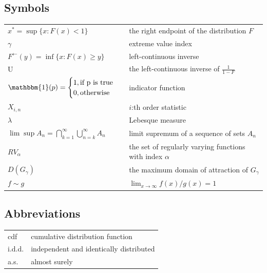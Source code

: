 \documentclass[english,12pt,a4paper,pdftex,sci,utf8]{aaltothesis} %
\begin{document}
\newpage


\thesistableofcontents



\subsection*{Symbols}

\begin{tabular}{ll}
$x^*=\sup\{x : F(x)<1\}$  & the right endpoint of the distribution $F$ \\
$\gamma$ & extreme value index \\
$F^{\leftarrow}(y) = \inf\{x:F(x) \geq y \}$ & left-continuous inverse \\
U & the left-continuous inverse of $\frac{1}{1-F}$ \\
$\mathbbm{1}(p)=
\begin{cases}
1 , \textrm{if p is true}\\
0, \textrm{otherwise}
\end{cases}$ & indicator function \\
$X_{i,n}$ & $i$:th order statistic \\
$\lambda$ & Lebesque measure \\
$\lim \sup A_n = \bigcap_{k=1}^{\infty} \bigcup_{n=k}^{\infty} A_n$ & limit supremum of a sequence of sets $A_n$ \\
$RV_{\alpha}$ & the set of regularly varying functions with index $\alpha$ \\
$D(G_{\gamma})$ & the maximum domain of attraction of $G_{\gamma}$ \\
$f \sim g$ & $\lim_{x \rightarrow \infty} f(x)/g(x)=1$ \\
\end{tabular}


\subsection*{Abbreviations}

\begin{tabular}{ll}
cdf         & cumulative distribution function \\
i.d.d.     & independent and identically distributed \\
a.s.         & almost surely\\
\end{tabular}
\end{document}
